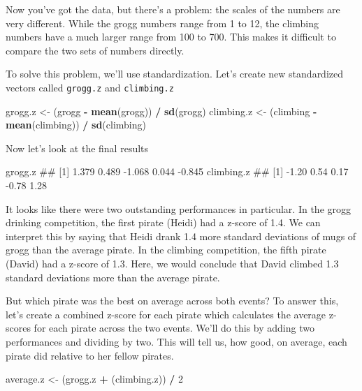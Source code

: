\documentclass[]{book}
\newenvironment{Shaded}{\begin{snugshade}}{\end{snugshade}}
\newcommand{\KeywordTok}[1]{\textcolor[rgb]{0.13,0.29,0.53}{\textbf{#1}}}
\newcommand{\DecValTok}[1]{\textcolor[rgb]{0.00,0.00,0.81}{#1}}
\newcommand{\StringTok}[1]{\textcolor[rgb]{0.31,0.60,0.02}{#1}}
\newcommand{\OperatorTok}[1]{\textcolor[rgb]{0.81,0.36,0.00}{\textbf{#1}}}
\newcommand{\NormalTok}[1]{#1}
\theoremstyle{definition}
\theoremstyle{definition}
\theoremstyle{remark}
\begin{document}
Now you've got the data, but there's a problem: the scales of the
numbers are very different. While the grogg numbers range from 1 to 12,
the climbing numbers have a much larger range from 100 to 700. This
makes it difficult to compare the two sets of numbers directly.

To solve this problem, we'll use standardization. Let's create new
standardized vectors called \texttt{grogg.z} and \texttt{climbing.z}

\begin{Shaded}
\begin{Highlighting}[]
\NormalTok{grogg.z <-}\StringTok{ }\NormalTok{(grogg }\OperatorTok{-}\StringTok{ }\KeywordTok{mean}\NormalTok{(grogg)) }\OperatorTok{/}\StringTok{ }\KeywordTok{sd}\NormalTok{(grogg)}
\NormalTok{climbing.z <-}\StringTok{ }\NormalTok{(climbing }\OperatorTok{-}\StringTok{ }\KeywordTok{mean}\NormalTok{(climbing)) }\OperatorTok{/}\StringTok{ }\KeywordTok{sd}\NormalTok{(climbing)}
\end{Highlighting}
\end{Shaded}

Now let's look at the final results

\begin{Shaded}
\begin{Highlighting}[]
\NormalTok{grogg.z}
\NormalTok{## [1]  1.379  0.489 -1.068  0.044 -0.845}
\NormalTok{climbing.z}
\NormalTok{## [1] -1.20  0.54  0.17 -0.78  1.28}
\end{Highlighting}
\end{Shaded}

It looks like there were two outstanding performances in particular. In
the grogg drinking competition, the first pirate (Heidi) had a z-score
of 1.4. We can interpret this by saying that Heidi drank 1.4 more
standard deviations of mugs of grogg than the average pirate. In the
climbing competition, the fifth pirate (David) had a z-score of 1.3.
Here, we would conclude that David climbed 1.3 standard deviations more
than the average pirate.

But which pirate was the best on average across both events? To answer
this, let's create a combined z-score for each pirate which calculates
the average z-scores for each pirate across the two events. We'll do
this by adding two performances and dividing by two. This will tell us,
how good, on average, each pirate did relative to her fellow pirates.

\begin{Shaded}
\begin{Highlighting}[]
\NormalTok{average.z <-}\StringTok{ }\NormalTok{(grogg.z }\OperatorTok{+}\StringTok{ }\NormalTok{(climbing.z)) }\OperatorTok{/}\StringTok{ }\DecValTok{2}
\end{Highlighting}
\end{Shaded}
\end{document}

